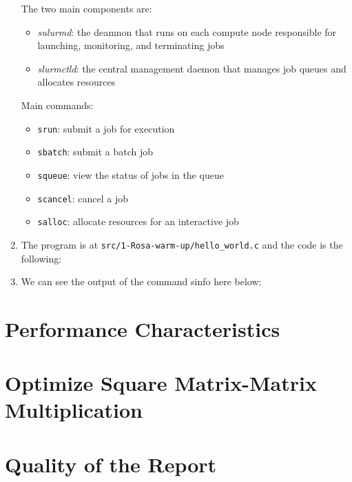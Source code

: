 \documentclass[unicode,11pt,a4paper,oneside,numbers=endperiod,openany]{scrartcl}
\begin{document}
\begin{enumerate}
    The two main components are:
    \begin{itemize}
        \item \textit{sulurmd}: the deamnon that runs on each compute node responsible for launching, monitoring, and terminating jobs
        \item \textit{slurmctld}: the central management daemon that manages job queues and allocates resources
    \end{itemize}

    Main commands:
    \begin{itemize}
        \item \texttt{srun}: submit a job for execution
        \item \texttt{sbatch}: submit a batch job
        \item \texttt{squeue}: view the status of jobs in the queue
        \item \texttt{scancel}: cancel a job
        \item \texttt{salloc}: allocate resources for an interactive job
    \end{itemize}

    \item %
    The program is at \texttt{src/1-Rosa-warm-up/hello\_world.c} and the code is the following:
    

    \item %
    We can see the output of the command sinfo here below: 
    
    
    
\end{enumerate}




\section{Performance Characteristics }


\section{Optimize Square Matrix-Matrix Multiplication  }


\section{Quality of the Report  }
\end{document}
